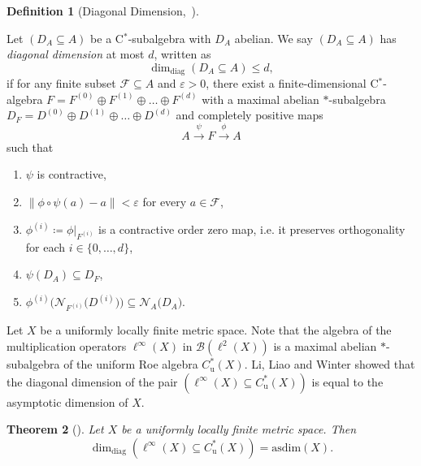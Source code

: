 \documentclass[a4paper]{amsart}
\newcommand{\myhyp}{\textnormal{-}\hskip0pt\relax}
\numberwithin{equation}{section}
\newcommand{\Bcal}{\mathcal{B}}
\newcommand{\Fcal}{\mathcal{F}}
\newcommand{\e}{\varepsilon}
\newcommand{\cstarSub}{C$^\ast$\myhyp{}subalgebra}
\newcommand{\bop}[1]{\Bcal({#1})}
\newcommand{\Cu}[1]{C^{\ast}_{\mathrm{u}}({#1})}
\newcommand{\prn}[1]{{(#1)}}
\newcommand{\norm}[1]{{\left\lVert #1 \right \rVert}}
\newcommand{\normalisers}[2]{{\mathcal{N}}_{#2}{\big({#1}\big)}}
\newcommand{\ddim}[2]{\dim_{\mathrm{diag}}({#1}\subseteq{#2})}
\newcommand{\asdim}[1]{\mathrm{asdim}({#1})}
\theoremstyle{plain}
\theoremstyle{indented}
\numberwithin{equation}{section}
\theoremstyle{definition}
\theoremstyle{remark}
\theoremstyle{plain}
\newtheorem{alphthm}{Theorem}
\theoremstyle{definition}
\newtheorem{alphdef}[alphthm]{Definition}
\begin{document}
\begin{alphdef}[{Diagonal Dimension,~\cite[Definition~2.1]{LiLiaoWinter2023diagDim}}] \label{intro:def:diagDim}

        Let ${(D_A \subseteq A)}$ be a \cstarSub{} with $D_A$ abelian. 
    We say ${(D_A \subseteq A)}$ has \emph{diagonal dimension} at most $d$, written as
    \[\ddim{D_A}{A} \le d,\]
    if for any finite subset ${\Fcal \subseteq A}$ and ${\e > 0}$, 
    there exist a finite\myhyp{}dimensional  \linebreak 
    C$^{\ast}$\myhyp{}algebra  
    ${F=F^{(0)} \oplus F^{(1)} \oplus \hdots \oplus F^{(d)}}$ with a maximal abelian $\ast$\myhyp{}subalgebra \linebreak
    ${D_F=D^{(0)} \oplus D^{(1)} \oplus \hdots \oplus D^{(d)}}$ 
    and completely positive maps 
    \[ A \overset{\psi}{\longrightarrow} F \overset{\phi}{\longrightarrow} A\]
    such that
    \begin{enumerate} \renewcommand{\labelenumi}{(\arabic{enumi})}
        \item $\psi$ is contractive,
        \item $\norm{\phi \circ \psi(a) - a } < \e $ for every $a \in \Fcal$,
        \item $\phi^{\prn{i}} \coloneq \phi|_{F^{(i)}}$ is a contractive order zero map, i.e. it preserves orthogonality for each ${i \in  \{0,\hdots,d\}}$,
        \item ${\psi(D_A) \subseteq D_F}$,
        \item ${\phi^{\prn{i}} \big( \normalisers{D^{(i)}}{F^{(i)}}\big) \subseteq \normalisers{D_A}{A}}$.
        
    \end{enumerate}
\end{alphdef}



Let $X$ be a uniformly locally finite metric space. 
Note that the algebra of the multiplication operators 
${\ell^\infty\prn{X}}$ in ${\bop{\ell^2\prn{X}}}$ 
is a maximal abelian $\ast$\myhyp{}subalgebra of the uniform Roe algebra $\Cu{X}$.
Li, Liao and Winter showed that the diagonal dimension of the pair ${(\ell^\infty\prn{X} \subseteq \Cu{X})}$ is equal to the asymptotic dimension of $X$.

\begin{alphthm}[{\cite[Theorem~7.7]{LiLiaoWinter2023diagDim}}] 
    Let $X$ be a uniformly locally finite metric space. Then
    \begin{equation*}
        \ddim{\ell^\infty\prn{X}}{\Cu{X}}=\asdim{X}.
    \end{equation*}
\end{alphthm}
\end{document}
